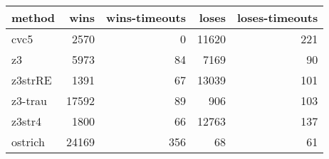 \begin{tabular}{lrrrr}
\hline
 method   &   wins &   wins-timeouts &   loses &   loses-timeouts \\
\hline
 cvc5     &   2570 &               0 &   11620 &              221 \\
 z3       &   5973 &              84 &    7169 &               90 \\
 z3strRE  &   1391 &              67 &   13039 &              101 \\
 z3-trau  &  17592 &              89 &     906 &              103 \\
 z3str4   &   1800 &              66 &   12763 &              137 \\
 ostrich  &  24169 &             356 &      68 &               61 \\
\hline
\end{tabular}
